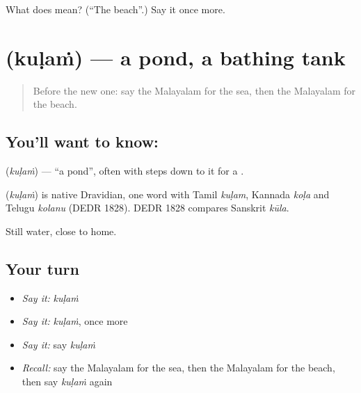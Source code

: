 \begin{tcolorbox}[breakable,colback=teal!4,colframe=teal!35!black,title={Before you move on}]
What does  mean? (\textquotedblleft{}The beach\textquotedblright{}.) Say it once more.
\end{tcolorbox}
\section[\texorpdfstring{\ml{കുളം} (kuḷaṁ)}{കുളം (kuḷaṁ)}]{ (kuḷaṁ) — a pond, a bathing tank}

\label{lesson:ML-C136-pond}



\begin{quote}
Before the new one: say the Malayalam for the sea, then the Malayalam for the beach.
\end{quote}

\subsection*{You'll want to know: }
\textbf{} (\emph{kuḷaṁ}) — \textquotedblleft{}a pond\textquotedblright{}, often with steps down to it for a \textbf{}.

\begin{cousinweb}
\textbf{} (\emph{kuḷaṁ}) is native Dravidian, one word with Tamil \emph{kuḷam}, Kannada \emph{koḷa} and Telugu \emph{kolanu} (DEDR 1828). DEDR 1828 compares Sanskrit \emph{kūla}.
\end{cousinweb}

\begin{grammarlens}[title={What you've built}]
Still water, close to home.
\end{grammarlens}

\subsection*{Your turn}
\begin{itemize}
\raggedright
  \item \emph{Say it:} \emph{kuḷaṁ}
  \item \emph{Say it:} \emph{kuḷaṁ}, once more
  \item \emph{Say it:} say \emph{kuḷaṁ}
  \item \emph{Recall:} say the Malayalam for the sea, then the Malayalam for the beach, then say \emph{kuḷaṁ} again
\end{itemize}

